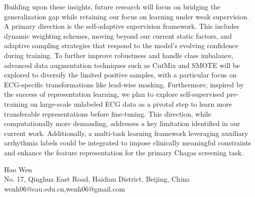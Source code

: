 \documentclass[twocolumn]{cinc}
\begin{document}
Building upon these insights, future research will focus on bridging the generalization gap while retaining our focus on learning under weak supervision. A primary direction is the self-adaptive supervision framework. This includes dynamic weighting schemes, moving beyond our current static factors, and adaptive sampling strategies that respond to the model's evolving confidence during training. To further improve robustness and handle class imbalance, advanced data augmentation techniques such as CutMix \cite{yun2019cutmix} and SMOTE \cite{Chawla_2002_SMOTE} will be explored to diversify the limited positive samples, with a particular focus on ECG-specific transformations like lead-wise masking. Furthermore, inspired by the success of representation learning, we plan to explore self-supervised pre-training on large-scale unlabeled ECG data as a pivotal step to learn more transferable representations before fine-tuning. This direction, while computationally more demanding, addresses a key limitation identified in our current work. Additionally, a multi-task learning framework leveraging auxiliary arrhythmia labels could be integrated to impose clinically meaningful constraints and enhance the feature representation for the primary Chagas screening task.




% 




% 

\begin{correspondence}
Hao Wen\\
No. 17, Qinghua East Road, Haidian District, Beijing, China\\
wenh06@cau.edu.cn,wenh06@gmail.com
\end{correspondence}

\balance
\end{document}
